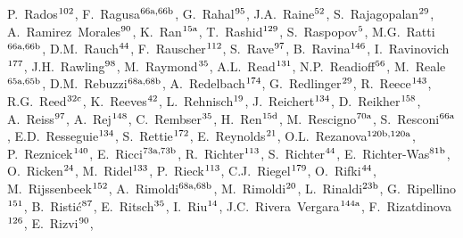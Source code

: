 \begin{flushleft}
P.~Rados$^\textrm{\scriptsize 102}$,    
F.~Ragusa$^\textrm{\scriptsize 66a,66b}$,    
G.~Rahal$^\textrm{\scriptsize 95}$,    
J.A.~Raine$^\textrm{\scriptsize 52}$,    
S.~Rajagopalan$^\textrm{\scriptsize 29}$,    
A.~Ramirez~Morales$^\textrm{\scriptsize 90}$,    
K.~Ran$^\textrm{\scriptsize 15a}$,    
T.~Rashid$^\textrm{\scriptsize 129}$,    
S.~Raspopov$^\textrm{\scriptsize 5}$,    
M.G.~Ratti$^\textrm{\scriptsize 66a,66b}$,    
D.M.~Rauch$^\textrm{\scriptsize 44}$,    
F.~Rauscher$^\textrm{\scriptsize 112}$,    
S.~Rave$^\textrm{\scriptsize 97}$,    
B.~Ravina$^\textrm{\scriptsize 146}$,    
I.~Ravinovich$^\textrm{\scriptsize 177}$,    
J.H.~Rawling$^\textrm{\scriptsize 98}$,    
M.~Raymond$^\textrm{\scriptsize 35}$,    
A.L.~Read$^\textrm{\scriptsize 131}$,    
N.P.~Readioff$^\textrm{\scriptsize 56}$,    
M.~Reale$^\textrm{\scriptsize 65a,65b}$,    
D.M.~Rebuzzi$^\textrm{\scriptsize 68a,68b}$,    
A.~Redelbach$^\textrm{\scriptsize 174}$,    
G.~Redlinger$^\textrm{\scriptsize 29}$,    
R.~Reece$^\textrm{\scriptsize 143}$,    
R.G.~Reed$^\textrm{\scriptsize 32c}$,    
K.~Reeves$^\textrm{\scriptsize 42}$,    
L.~Rehnisch$^\textrm{\scriptsize 19}$,    
J.~Reichert$^\textrm{\scriptsize 134}$,    
D.~Reikher$^\textrm{\scriptsize 158}$,    
A.~Reiss$^\textrm{\scriptsize 97}$,    
A.~Rej$^\textrm{\scriptsize 148}$,    
C.~Rembser$^\textrm{\scriptsize 35}$,    
H.~Ren$^\textrm{\scriptsize 15d}$,    
M.~Rescigno$^\textrm{\scriptsize 70a}$,    
S.~Resconi$^\textrm{\scriptsize 66a}$,    
E.D.~Resseguie$^\textrm{\scriptsize 134}$,    
S.~Rettie$^\textrm{\scriptsize 172}$,    
E.~Reynolds$^\textrm{\scriptsize 21}$,    
O.L.~Rezanova$^\textrm{\scriptsize 120b,120a}$,    
P.~Reznicek$^\textrm{\scriptsize 140}$,    
E.~Ricci$^\textrm{\scriptsize 73a,73b}$,    
R.~Richter$^\textrm{\scriptsize 113}$,    
S.~Richter$^\textrm{\scriptsize 44}$,    
E.~Richter-Was$^\textrm{\scriptsize 81b}$,    
O.~Ricken$^\textrm{\scriptsize 24}$,    
M.~Ridel$^\textrm{\scriptsize 133}$,    
P.~Rieck$^\textrm{\scriptsize 113}$,    
C.J.~Riegel$^\textrm{\scriptsize 179}$,    
O.~Rifki$^\textrm{\scriptsize 44}$,    
M.~Rijssenbeek$^\textrm{\scriptsize 152}$,    
A.~Rimoldi$^\textrm{\scriptsize 68a,68b}$,    
M.~Rimoldi$^\textrm{\scriptsize 20}$,    
L.~Rinaldi$^\textrm{\scriptsize 23b}$,    
G.~Ripellino$^\textrm{\scriptsize 151}$,    
B.~Risti\'{c}$^\textrm{\scriptsize 87}$,    
E.~Ritsch$^\textrm{\scriptsize 35}$,    
I.~Riu$^\textrm{\scriptsize 14}$,    
J.C.~Rivera~Vergara$^\textrm{\scriptsize 144a}$,    
F.~Rizatdinova$^\textrm{\scriptsize 126}$,    
E.~Rizvi$^\textrm{\scriptsize 90}$,    

\end{flushleft}
